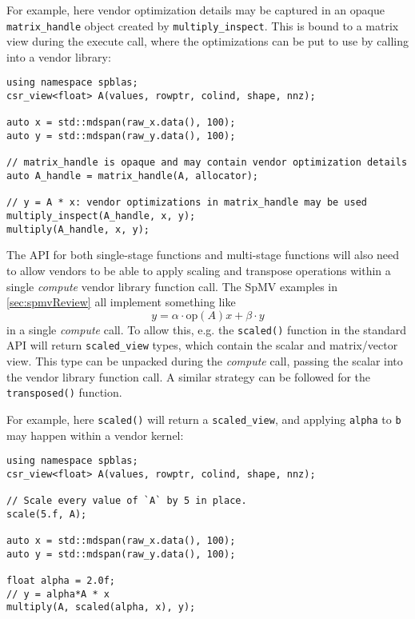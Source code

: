 \documentclass{article}
\begin{document}
For example, here vendor optimization details may be captured in an opaque \texttt{matrix\_handle} object created by \texttt{multiply\_inspect}. This is bound to a matrix view during the execute call, where the optimizations can be put to use by calling into a vendor library:

\begin{verbatim}
using namespace spblas;
csr_view<float> A(values, rowptr, colind, shape, nnz);

auto x = std::mdspan(raw_x.data(), 100);
auto y = std::mdspan(raw_y.data(), 100);

// matrix_handle is opaque and may contain vendor optimization details
auto A_handle = matrix_handle(A, allocator);

// y = A * x: vendor optimizations in matrix_handle may be used
multiply_inspect(A_handle, x, y);
multiply(A_handle, x, y); 
\end{verbatim}


The API for both single-stage functions and multi-stage functions will also need to allow vendors to be able to apply scaling and transpose operations within a single \textit{compute}  vendor library function call. The SpMV examples in \ref{sec:spmvReview} all implement something like \begin{equation*}y = \alpha\cdot\text{op}\left(A\right) x + \beta\cdot y\end{equation*} in a single \textit{compute} call. To allow this, e.g. the \texttt{scaled()} function in the standard API will return \texttt{scaled\_view} types, which contain the scalar and matrix/vector view. This type can be unpacked during the \textit{compute} call, passing the scalar into the vendor library function call. A similar strategy can be followed for the \texttt{transposed()} function.

For example, here \texttt{scaled()} will return a \texttt{scaled\_view}, and applying \texttt{alpha} to \texttt{b} may happen within a vendor kernel:
\begin{verbatim}
using namespace spblas;
csr_view<float> A(values, rowptr, colind, shape, nnz);

// Scale every value of `A` by 5 in place.
scale(5.f, A);

auto x = std::mdspan(raw_x.data(), 100);
auto y = std::mdspan(raw_y.data(), 100);

float alpha = 2.0f;
// y = alpha*A * x
multiply(A, scaled(alpha, x), y);
\end{verbatim}
\end{document}
